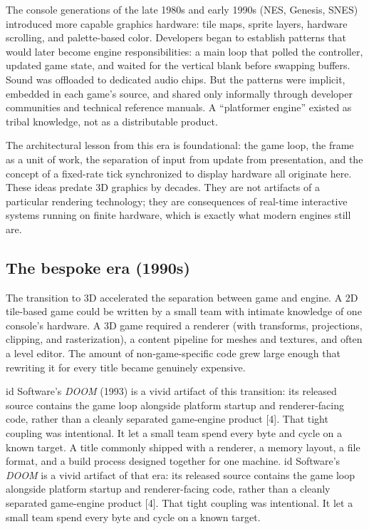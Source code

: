 \documentclass[
  11pt,
  letterpaper,
  DIV=11,
  numbers=noendperiod,
  twoside,
  open=right]{scrreprt}
\begin{document}
The console generations of the late 1980s and early 1990s (NES, Genesis,
SNES) introduced more capable graphics hardware: tile maps, sprite
layers, hardware scrolling, and palette-based color. Developers began to
establish patterns that would later become engine responsibilities: a
main loop that polled the controller, updated game state, and waited for
the vertical blank before swapping buffers. Sound was offloaded to
dedicated audio chips. But the patterns were implicit, embedded in each
game's source, and shared only informally through developer communities
and technical reference manuals. A ``platformer engine'' existed as
tribal knowledge, not as a distributable product.

The architectural lesson from this era is foundational: the game loop,
the frame as a unit of work, the separation of input from update from
presentation, and the concept of a fixed-rate tick synchronized to
display hardware all originate here. These ideas predate 3D graphics by
decades. They are not artifacts of a particular rendering technology;
they are consequences of real-time interactive systems running on finite
hardware, which is exactly what modern engines still are.

\subsection{The bespoke era (1990s)}\label{the-bespoke-era-1990s}

The transition to 3D accelerated the separation between game and engine.
A 2D tile-based game could be written by a small team with intimate
knowledge of one console's hardware. A 3D game required a renderer (with
transforms, projections, clipping, and rasterization), a content
pipeline for meshes and textures, and often a level editor. The amount
of non-game-specific code grew large enough that rewriting it for every
title became genuinely expensive.

id Software's \emph{DOOM} (1993) is a vivid artifact of this transition:
its released source contains the game loop alongside platform startup
and renderer-facing code, rather than a cleanly separated game-engine
product {[}4{]}. That tight coupling was intentional. It let a small
team spend every byte and cycle on a known target. A title commonly
shipped with a renderer, a memory layout, a file format, and a build
process designed together for one machine. id Software's \emph{DOOM} is
a vivid artifact of that era: its released source contains the game loop
alongside platform startup and renderer-facing code, rather than a
cleanly separated game-engine product {[}4{]}. That tight coupling was
intentional. It let a small team spend every byte and cycle on a known
target.
\end{document}
